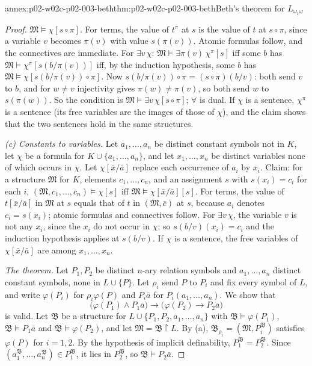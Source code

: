 \begin{annexitem}{annex:p02-w02c-p02-003-beth}{thm:p02-w02c-p02-003-beth}{Beth's theorem for \(L_{\omega_1\omega}\)}
\begin{proof}
\(\mathfrak M\models\chi[s\circ\pi]\).  For terms, the value of \(t^{\pi}\)
at \(s\) is the value of \(t\) at \(s\circ\pi\), since a variable \(v\)
becomes \(\pi(v)\) with value \(s(\pi(v))\).  Atomic formulas follow, and
the connectives are immediate.  For \(\exists v\,\chi\):
\(\mathfrak M\models\exists\pi(v)\,\chi^{\pi}[s]\) iff some \(b\) has
\(\mathfrak M\models\chi^{\pi}[s(b/\pi(v))]\) iff, by the induction
hypothesis, some \(b\) has \(\mathfrak M\models\chi[s(b/\pi(v))\circ\pi]\).
Now \(s(b/\pi(v))\circ\pi=(s\circ\pi)(b/v)\): both send \(v\) to \(b\),
and for \(w\neq v\) injectivity gives \(\pi(w)\neq\pi(v)\), so both send
\(w\) to \(s(\pi(w))\).  So the condition is
\(\mathfrak M\models\exists v\,\chi[s\circ\pi]\); \(\forall\) is dual.  If
\(\chi\) is a sentence, \(\chi^{\pi}\) is a sentence (its free variables
are the images of those of \(\chi\)), and the claim shows that the two
sentences hold in the same structures.

\emph{(c) Constants to variables.}  Let \(a_1,\ldots,a_n\) be distinct
constant symbols not in \(K\), let \(\chi\) be a formula for
\(K\cup\{a_1,\ldots,a_n\}\), and let \(x_1,\ldots,x_n\) be distinct
variables none of which occurs in \(\chi\).  Let \(\chi[\bar x/\bar a]\)
replace each occurrence of \(a_i\) by \(x_i\).  Claim: for a structure
\(\mathfrak M\) for \(K\), elements \(c_1,\ldots,c_n\), and an assignment
\(s\) with \(s(x_i)=c_i\) for each \(i\),
\((\mathfrak M,c_1,\ldots,c_n)\models\chi[s]\) iff
\(\mathfrak M\models\chi[\bar x/\bar a][s]\).  For terms, the value of
\(t[\bar x/\bar a]\) in \(\mathfrak M\) at \(s\) equals that of \(t\) in
\((\mathfrak M,\bar c)\) at \(s\), because \(a_i\) denotes \(c_i=s(x_i)\);
atomic formulas and connectives follow.  For \(\exists v\,\chi\), the
variable \(v\) is not any \(x_i\), since the \(x_i\) do not occur in
\(\chi\); so \(s(b/v)(x_i)=c_i\) and the induction hypothesis applies at
\(s(b/v)\).  If \(\chi\) is a sentence, the free variables of
\(\chi[\bar x/\bar a]\) are among \(x_1,\ldots,x_n\).

\emph{The theorem.}  Let \(P_1,P_2\) be distinct \(n\)-ary relation
symbols and \(a_1,\ldots,a_n\) distinct constant symbols, none in
\(L\cup\{P\}\).  Let \(\rho_i\) send \(P\) to \(P_i\) and fix every symbol
of \(L\), and write \(\varphi(P_i)\) for \(\rho_i\varphi(P)\) and
\(P_i\bar a\) for \(P_i(a_1,\ldots,a_n)\).  We show that
\[
 \bigl(\varphi(P_1)\land P_1\bar a\bigr)\to
 \bigl(\varphi(P_2)\to P_2\bar a\bigr)
\]
is valid.  Let \(\mathfrak B\) be a structure for
\(L\cup\{P_1,P_2,a_1,\ldots,a_n\}\) with
\(\mathfrak B\models\varphi(P_1)\), \(\mathfrak B\models P_1\bar a\) and
\(\mathfrak B\models\varphi(P_2)\), and let
\(\mathfrak M=\mathfrak B\restriction L\).  By (a),
\(\mathfrak B_{\rho_i}=(\mathfrak M,P_i^{\mathfrak B})\) satisfies
\(\varphi(P)\) for \(i=1,2\).  By the hypothesis of implicit
definability, \(P_1^{\mathfrak B}=P_2^{\mathfrak B}\).  Since
\((a_1^{\mathfrak B},\ldots,a_n^{\mathfrak B})\in P_1^{\mathfrak B}\), it
lies in \(P_2^{\mathfrak B}\), so \(\mathfrak B\models P_2\bar a\).


\end{proof}
\end{annexitem}
